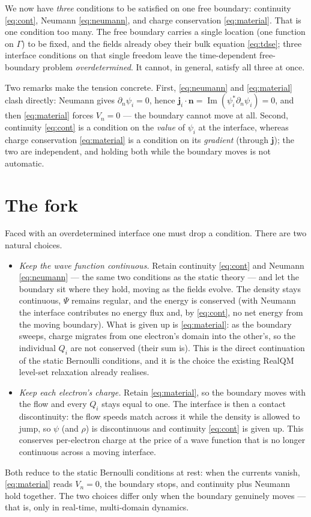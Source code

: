 \documentclass[11pt]{article}
\begin{document}
We now have \emph{three} conditions to be satisfied on one free boundary: continuity \eqref{eq:cont},
Neumann \eqref{eq:neumann}, and charge conservation \eqref{eq:material}. That is one condition too many.
The free boundary carries a single location (one function on $\Gamma$) to be fixed, and the fields already
obey their bulk equation \eqref{eq:tdse}; three interface conditions on that single freedom leave the
time-dependent free-boundary problem \emph{overdetermined}. It cannot, in general, satisfy all three at
once.

Two remarks make the tension concrete. First, \eqref{eq:neumann} and \eqref{eq:material} clash directly:
Neumann gives $\partial_n\psi_i=0$, hence $\mathbf j_i\!\cdot\!\mathbf n=\operatorname{Im}(\psi_i^*
\partial_n\psi_i)=0$, and then \eqref{eq:material} forces $V_n=0$ --- the boundary cannot move at all.
Second, continuity \eqref{eq:cont} is a condition on the \emph{value} of $\psi_i$ at the interface, whereas
charge conservation \eqref{eq:material} is a condition on its \emph{gradient} (through $\mathbf j$); the two
are independent, and holding both while the boundary moves is not automatic.

\section{The fork}
\label{sec:fork}

Faced with an overdetermined interface one must drop a condition. There are two natural choices.
\begin{itemize}
\item[(A)] \emph{Keep the wave function continuous.} Retain continuity \eqref{eq:cont} and Neumann
\eqref{eq:neumann} --- the same two conditions as the static theory --- and let the boundary sit where they
hold, moving as the fields evolve. The density stays continuous, $\Psi$ remains regular, and the energy is
conserved (with Neumann the interface contributes no energy flux and, by \eqref{eq:cont}, no net energy from
the moving boundary). What is given up is \eqref{eq:material}: as the boundary sweeps, charge migrates from
one electron's domain into the other's, so the individual $Q_i$ are not conserved (their sum is). This is
the direct continuation of the static Bernoulli conditions, and it is the choice the existing RealQM
level-set relaxation already realises.
\item[(B)] \emph{Keep each electron's charge.} Retain \eqref{eq:material}, so the boundary moves with the
flow and every $Q_i$ stays equal to one. The interface is then a contact discontinuity: the flow speeds
match across it while the density is allowed to jump, so $\psi$ (and $\rho$) is discontinuous and continuity
\eqref{eq:cont} is given up. This conserves per-electron charge at the price of a wave function that is no
longer continuous across a moving interface.
\end{itemize}
Both reduce to the static Bernoulli conditions at rest: when the currents vanish, \eqref{eq:material} reads
$V_n=0$, the boundary stops, and continuity plus Neumann hold together. The two choices differ only when the
boundary genuinely moves --- that is, only in real-time, multi-domain dynamics.
\end{document}
